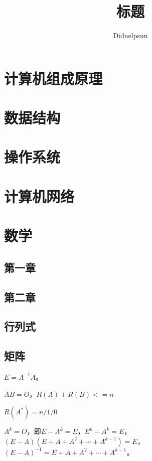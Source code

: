 \documentclass[UTF8, 12pt]{ctexart}
\author{Didnelpsun}
\title{标题}
\date{}
\begin{document}
\maketitle
\pagestyle{empty}
\thispagestyle{empty}
\tableofcontents
\thispagestyle{empty}
\newpage
\pagestyle{plain}
\setcounter{page}{1}
\section{计算机组成原理}
\section{数据结构}
\section{操作系统}
\section{计算机网络}
\section{数学}
\subsection{第一章}
\subsection{第二章}
\subsection{行列式}
\subsection{矩阵}

$E=A^{-1}A$。

$AB=O$，$R(A)+R(B)<=n$

$R(A^*)=n/1/0$

$A^k=O$，即$E-A^k=E$，$E^k-A^k=E$，$(E-A)(E+A+A^2+\cdots+A^{k-1})=E$，$(E-A)^{-1}=E+A+A^2+\cdots+A^{k-1}$。
\end{document}
